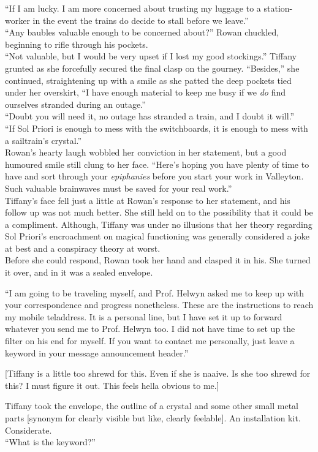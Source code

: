 ``If I am lucky. I am more concerned about trusting my luggage to a station-worker in the event the trains do decide to stall before we leave.''\\

``Any baubles valuable enough to be concerned about?'' Rowan chuckled, beginning to rifle through his pockets.\\

``Not valuable, but I would be very upset if I lost my good stockings.'' Tiffany grunted as she forcefully secured the final clasp on the gourney.
``Besides,'' she continued, straightening up with a smile as she patted the deep pockets tied under her overskirt, 
``I have enough material to keep me busy if we \textit{do} find ourselves stranded during an outage.''\\

``Doubt you will need it, no outage has stranded a train, and I doubt it will.''\\

``If Sol Priori is enough to mess with the switchboards, it is enough to mess with a sailtrain's crystal.''\\

Rowan's hearty laugh wobbled her conviction in her statement, but a good humoured smile still clung to her face.
``Here's hoping you have plenty of time to have and sort through your \textit{epiphanies} before you start your work in Valleyton. 
Such valuable brainwaves must be saved for your real work.''\\

Tiffany's face fell just a little at Rowan's response to her statement, and his follow up was not much better. 
She still held on to the possibility that it could be a compliment. 
Although, Tiffany was under no illusions that her theory regarding Sol Priori's encroachment on magical functioning was generally considered a joke at best and a conspiracy theory at worst.\\

Before she could respond, Rowan took her hand and clasped it in his.
She turned it over, and in it was a sealed envelope.

``I am going to be traveling myself, and Prof. Helwyn asked me to keep up with your correspondence and progress nonetheless. 
These are the instructions to reach my mobile teladdress. 
It is a personal line, but I have set it up to forward whatever you send me to Prof. Helwyn too. 
I did not have time to set up the filter on his end for myself. 
If you want to contact me personally, just leave a keyword in your message announcement header.''

[Tiffany is a little too shrewd for this. Even if she is naaive. Is she too shrewd for this? I must figure it out. This feels hella obvious to me.]

Tiffany took the envelope, the outline of a crystal and some other small metal parts [synonym for clearly visible but like, clearly feelable].
An installation kit.
Considerate.\\

``What is the keyword?''


